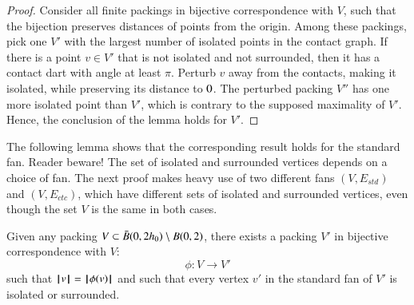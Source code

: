 \begin{proof} Consider all finite packings in 
bijective correspondence with $V$, such that the
bijection preserves distances of points from the origin.
Among these packings, pick one $V'$ with the largest number
of isolated points in the contact graph.  If there is a point $v\in V'$ that
is not isolated and not surrounded, then it has a contact
dart with angle at least $\pi$.   Perturb $v$ away from the contacts, making it isolated, while preserving its distance to $0$.  The perturbed packing $V''$ has one more isolated point than $V'$, which is contrary to the supposed maximality of $V'$.  Hence, the conclusion of the 
lemma holds for $V'$.
\end{proof}

The following lemma shows that the corresponding result
holds for the standard fan.  Reader beware!  The set of isolated and surrounded vertices depends on a 
choice of fan.  The next proof makes heavy use of two different fans $(V,E_{std})$ and $(V,E_{ctc})$,
which have different sets of isolated and surrounded vertices, even though the set $V$ is
the same in both cases.



\begin{lemma}\label{lemma:surrounded}  %
Given any packing $V\subset \bar B(0,2{h_0})\setminus B(0,2)$,
there exists a  packing $V'$ 
in bijective correspondence with $V$:
$$
\phi:V\to V'
$$
such that ${{\hskip0.1em|\hskip-0.15em|\hskip0.1em}v{\hskip0.1em|\hskip-0.15em|\hskip0.1em}} = {{\hskip0.1em|\hskip-0.15em|\hskip0.1em}\phi(v){\hskip0.1em|\hskip-0.15em|\hskip0.1em}}$ and
such that every vertex $v'$ in the standard fan of $V'$
is isolated or surrounded.
%
\end{lemma}

